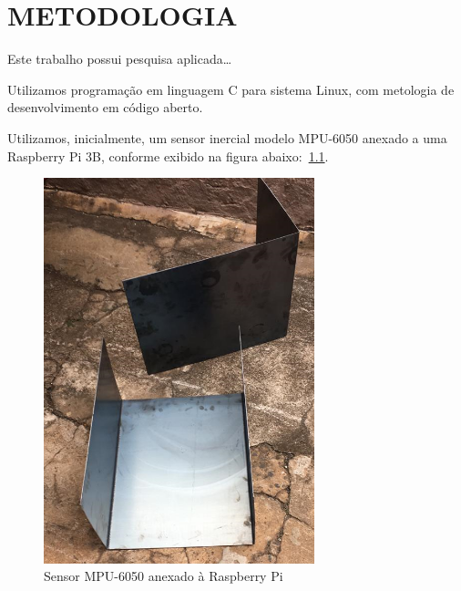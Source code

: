 \chapter{METODOLOGIA}\label{chap:metodologia}

Este trabalho possui pesquisa aplicada\ldots

Utilizamos programação em linguagem C para sistema Linux, com metologia de desenvolvimento em código aberto.

Utilizamos, inicialmente, um sensor inercial modelo MPU-6050 anexado a uma Raspberry Pi 3B, conforme exibido na figura abaixo:~\ref{fig:figura22}.

\begin{figure}[H]
    \centering
    \caption{Sensor MPU-6050 anexado à Raspberry Pi}\label{fig:figura22}
    \includegraphics[width=0.7\textwidth]{figuras/figu22.png}
\end{figure}
